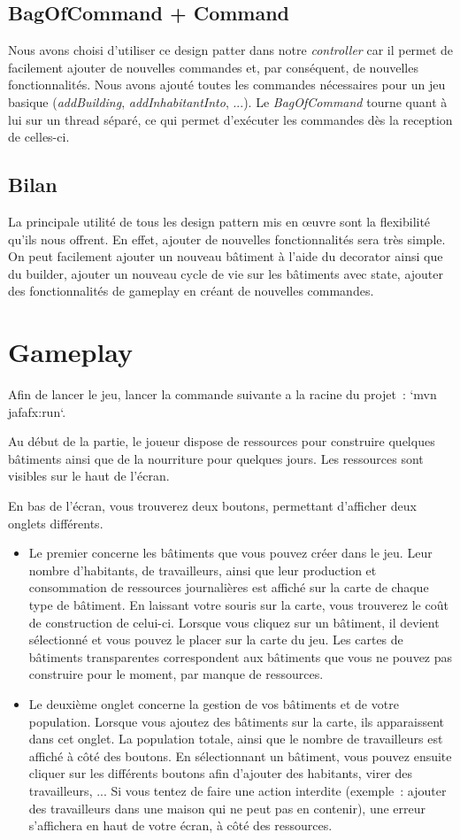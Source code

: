 \documentclass{article}
\begin{document}
\subsection{BagOfCommand + Command}
Nous avons choisi d'utiliser ce design patter dans notre \textit{controller} car il permet de facilement ajouter de nouvelles commandes et, par conséquent,
de nouvelles fonctionnalités. Nous avons ajouté toutes les commandes nécessaires pour un jeu basique (\textit{addBuilding}, \textit{addInhabitantInto}, ...).
Le \textit{BagOfCommand} tourne quant à lui sur un thread séparé, ce qui permet d'exécuter les commandes dès la reception de celles-ci.

\subsection{Bilan}
La principale utilité de tous les design pattern mis en œuvre sont la flexibilité qu'ils nous offrent. En effet, ajouter de nouvelles fonctionnalités sera
très simple. On peut facilement ajouter un nouveau bâtiment à l'aide du decorator ainsi que du builder, ajouter un nouveau cycle de vie sur les bâtiments 
avec state, ajouter des fonctionnalités de gameplay en créant de nouvelles commandes.

\section{Gameplay}

Afin de lancer le jeu, lancer la commande suivante a la racine du projet : `mvn jafafx:run`.


Au début de la partie, le joueur dispose de ressources pour construire quelques bâtiments ainsi
que de la nourriture pour quelques jours. Les ressources sont visibles sur le haut de l'écran.


En bas de l'écran, vous trouverez deux boutons, permettant d'afficher deux onglets différents.
\begin{itemize}
\item Le premier concerne les bâtiments que vous pouvez créer dans le jeu. Leur nombre d'habitants, de travailleurs,
ainsi que leur production et consommation de ressources journalières est affiché sur la carte de chaque type de bâtiment.
En laissant votre souris sur la carte, vous trouverez le coût de construction de celui-ci.
Lorsque vous cliquez sur un bâtiment, il devient sélectionné et vous pouvez le placer sur la carte du jeu.
Les cartes de bâtiments transparentes correspondent aux bâtiments que vous ne pouvez pas construire pour le moment,
par manque de ressources.
\item Le deuxième onglet concerne la gestion de vos bâtiments et de votre population. Lorsque vous ajoutez
des bâtiments sur la carte, ils apparaissent dans cet onglet. La population totale, ainsi que
le nombre de travailleurs est affiché à côté des boutons. En sélectionnant un bâtiment, vous pouvez ensuite
cliquer sur les différents boutons afin d'ajouter des habitants, virer des travailleurs, ...
Si vous tentez de faire une action interdite (exemple : ajouter des travailleurs dans une maison qui ne peut pas en contenir),
une erreur s'affichera en haut de votre écran, à côté des ressources.
\end{itemize}
\end{document}
